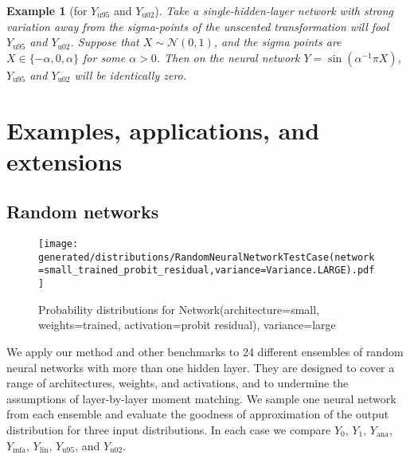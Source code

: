 \documentclass{article}
\newtheorem{example}{Example}
\begin{document}
\begin{example}[for \(Y_\mathrm{u95}\) and \(Y_\mathrm{u02}\)]
  Take a single-hidden-layer network with strong variation away from the sigma-points of the unscented transformation will fool \(Y_\mathrm{u95}\) and \(Y_\mathrm{u02}\).
  Suppose that \(X \sim \mathcal N(0, 1)\), and the sigma points are \(X \in \{-\alpha, 0, \alpha\}\) for some \(\alpha > 0\).
  Then on the neural network \(Y = \sin(\alpha^{-1}\pi X)\), \(Y_\mathrm{u95}\) and \(Y_\mathrm{u02}\) will be identically zero.
\end{example}


\section{Examples, applications, and extensions}
\subsection{Random networks}
\label{sec:random-networks}

\begin{table}\begin{center}
\end{center}
\caption{\label{table:random-neural-networks-small-trained-probit-residual}Summary statistics for Network(architecture=small, weights=trained, activation=probit residual), variance=large}
\end{table}
\begin{figure}\begin{center}
\texttt{[image: generated/distributions/RandomNeuralNetworkTestCase(network=small\_trained\_probit\_residual,variance=Variance.LARGE).pdf]}
\end{center}
\caption{\label{fig:random-neural-networks-small-trained-probit-residual}Probability distributions for Network(architecture=small, weights=trained, activation=probit residual), variance=large}
\end{figure}
We apply our method and other benchmarks to 24 different ensembles of random neural networks with more than one hidden layer.
They are designed to cover a range of architectures, weights, and activations, and to undermine the assumptions of layer-by-layer moment matching.
We sample one neural network from each ensemble and evaluate the goodness of approximation of the output distribution for three input distributions.
In each case we compare \(Y_0\), \(Y_1\), \(Y_\mathrm{ana}\), \(Y_\mathrm{mfa}\), \(Y_\mathrm{lin}\), \(Y_\mathrm{u95}\), and \(Y_\mathrm{u02}\).
\end{document}
